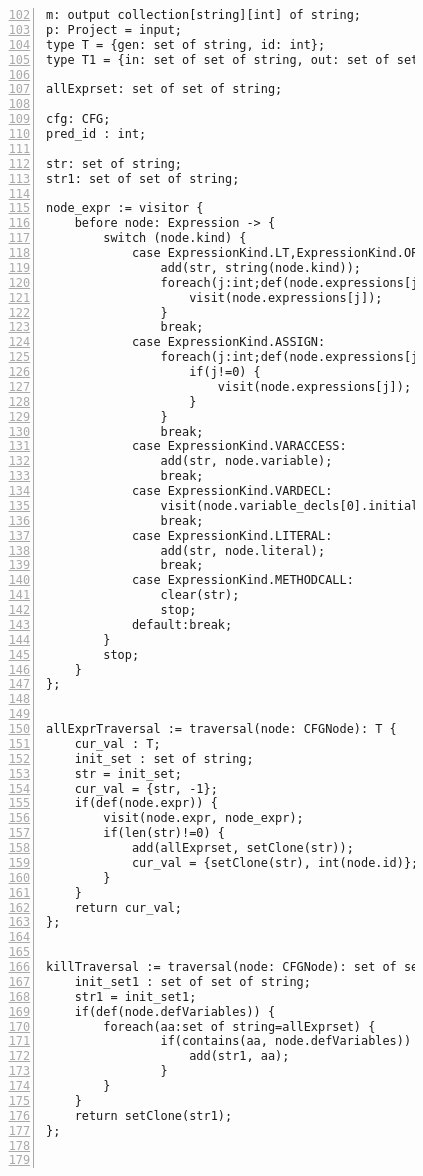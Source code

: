 \begin{figure}[ht!]
\begin{lstlisting}[numbers=left, tabsize=4, escapechar=@, caption={Common subexpression detection},label={lst:csd-code},firstline=102, firstnumber=102] 
m: output collection[string][int] of string;
p: Project = input;
type T = {gen: set of string, id: int};
type T1 = {in: set of set of string, out: set of set of string, id : int};

allExprset: set of set of string;

cfg: CFG;
pred_id : int;

str: set of string;
str1: set of set of string;

node_expr := visitor {
	before node: Expression -> {
		switch (node.kind) {
			case ExpressionKind.LT,ExpressionKind.OP_ADD, ExpressionKind.OP_SUB, ExpressionKind.OP_INC, ExpressionKind.OP_MULT, ExpressionKind.OP_DIV, ExpressionKind.OP_MOD, ExpressionKind.OP_DEC, ExpressionKind.GT, ExpressionKind.EQ, ExpressionKind.NEQ, ExpressionKind.LTEQ, ExpressionKind.GTEQ, ExpressionKind.LOGICAL_NOT, ExpressionKind.LOGICAL_AND, ExpressionKind.LOGICAL_OR, ExpressionKind.BIT_AND, ExpressionKind.BIT_OR, ExpressionKind.BIT_NOT, ExpressionKind.BIT_XOR, ExpressionKind.BIT_LSHIFT, ExpressionKind.BIT_RSHIFT, ExpressionKind.BIT_UNSIGNEDRSHIFT:
				add(str, string(node.kind)); 
				foreach(j:int;def(node.expressions[j])) {
					visit(node.expressions[j]);
				}
				break;
			case ExpressionKind.ASSIGN:
				foreach(j:int;def(node.expressions[j])) {
					if(j!=0) {
						visit(node.expressions[j]);
					}
				}
				break;
			case ExpressionKind.VARACCESS:
				add(str, node.variable);
				break;
			case ExpressionKind.VARDECL:
				visit(node.variable_decls[0].initializer);
				break;
			case ExpressionKind.LITERAL:
				add(str, node.literal);
				break;
			case ExpressionKind.METHODCALL:
				clear(str);
				stop;
			default:break;
		}
		stop;
	}
};


allExprTraversal := traversal(node: CFGNode): T {
	cur_val : T;
	init_set : set of string;
	str = init_set;
	cur_val = {str, -1};
	if(def(node.expr)) {
		visit(node.expr, node_expr);
		if(len(str)!=0) {
			add(allExprset, setClone(str));
			cur_val = {setClone(str), int(node.id)};
		}
	}
	return cur_val;
};


killTraversal := traversal(node: CFGNode): set of set of string {
	init_set1 : set of set of string;
	str1 = init_set1;
	if(def(node.defVariables)) {
		foreach(aa:set of string=allExprset) {
				if(contains(aa, node.defVariables)) {
					add(str1, aa);
				}
		}
	}
	return setClone(str1);
};



\end{lstlisting}
\end{figure}
